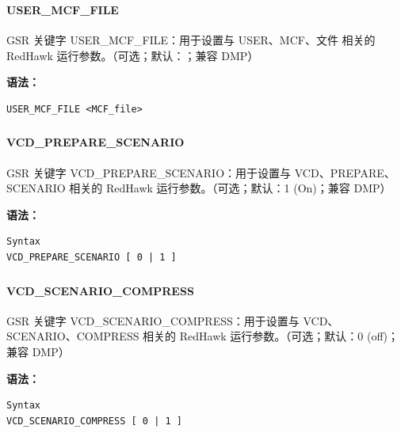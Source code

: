 \subsubsection{}
\paragraph*{USER_MCF_FILE}

GSR 关键字 USER_MCF_FILE：用于设置与 USER、MCF、文件 相关的 RedHawk 运行参数。（可选；默认：；兼容 DMP）

\textbf{语法：}
\begin{lstlisting}
USER_MCF_FILE <MCF_file>
\end{lstlisting}

\subsubsection{}
\paragraph*{VCD_PREPARE_SCENARIO}

GSR 关键字 VCD_PREPARE_SCENARIO：用于设置与 VCD、PREPARE、SCENARIO 相关的 RedHawk 运行参数。（可选；默认：1 (On)；兼容 DMP）

\textbf{语法：}
\begin{lstlisting}
Syntax
VCD_PREPARE_SCENARIO [ 0 | 1 ]
\end{lstlisting}

\subsubsection{}
\paragraph*{VCD_SCENARIO_COMPRESS}

GSR 关键字 VCD_SCENARIO_COMPRESS：用于设置与 VCD、SCENARIO、COMPRESS 相关的 RedHawk 运行参数。（可选；默认：0 (off)；兼容 DMP）

\textbf{语法：}
\begin{lstlisting}
Syntax
VCD_SCENARIO_COMPRESS [ 0 | 1 ]
\end{lstlisting}

\subsubsection{}
